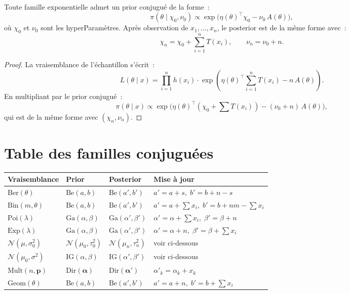 \begin{theoreme}
Toute famille exponentielle admet un prior conjugu\'e de la forme~:
\[
  \pi(\theta \mid \chi_0, \nu_0) \propto
  \exp\!\big(\eta(\theta)^\top \chi_0 - \nu_0\,A(\theta)\big),
\]
o\`u $\chi_0$ et $\nu_0$ sont les hyperParam\`etres. Apr\`es observation
de $x_1, \ldots, x_n$, le posterior est de la m\^eme forme avec~:
\[
  \chi_n = \chi_0 + \sum_{i=1}^n T(x_i), \qquad
  \nu_n = \nu_0 + n.
\]
\end{theoreme}

\begin{proof}
La vraisemblance de l'\'echantillon s'\'ecrit~:
\[
  L(\theta \mid x) = \prod_{i=1}^n h(x_i) \cdot
  \exp\!\left(\eta(\theta)^\top \sum_{i=1}^n T(x_i) - n\,A(\theta)\right).
\]
En multipliant par le prior conjugu\'e~:
\[
  \pi(\theta \mid x) \propto
  \exp\!\big(\eta(\theta)^\top (\chi_0 + \textstyle\sum T(x_i))
  - (\nu_0 + n)\,A(\theta)\big),
\]
qui est de la m\^eme forme avec $(\chi_n, \nu_n)$.
\end{proof}

\section{Table des familles conjugu\'ees}

\begin{formules}[title=\textbf{Principales familles conjugu\'ees}]
\begin{center}
\renewcommand{\arraystretch}{1.4}
\begin{tabular}{llll}
\toprule
\textbf{Vraisemblance} & \textbf{Prior} & \textbf{Posterior} & \textbf{Mise \`a jour} \\
\midrule
$\text{Ber}(\theta)$ & $\text{Be}(a,b)$ & $\text{Be}(a',b')$ &
  $a'=a+s,\; b'=b+n-s$ \\
$\text{Bin}(m,\theta)$ & $\text{Be}(a,b)$ & $\text{Be}(a',b')$ &
  $a'=a+\sum x_i,\; b'=b+nm-\sum x_i$ \\
$\text{Poi}(\lambda)$ & $\text{Ga}(\alpha,\beta)$ & $\text{Ga}(\alpha',\beta')$ &
  $\alpha'=\alpha+\sum x_i,\; \beta'=\beta+n$ \\
$\text{Exp}(\lambda)$ & $\text{Ga}(\alpha,\beta)$ & $\text{Ga}(\alpha',\beta')$ &
  $\alpha'=\alpha+n,\; \beta'=\beta+\sum x_i$ \\
$\mathcal{N}(\mu,\sigma^2_0)$ & $\mathcal{N}(\mu_0,\tau^2_0)$ &
  $\mathcal{N}(\mu_n,\tau^2_n)$ & voir ci-dessous \\
$\mathcal{N}(\mu_0,\sigma^2)$ & $\text{IG}(\alpha,\beta)$ &
  $\text{IG}(\alpha',\beta')$ & voir ci-dessous \\
$\text{Mult}(n,\boldsymbol{p})$ & $\text{Dir}(\boldsymbol{\alpha})$ &
  $\text{Dir}(\boldsymbol{\alpha}')$ &
  $\alpha'_k = \alpha_k + x_k$ \\
$\text{Geom}(\theta)$ & $\text{Be}(a,b)$ & $\text{Be}(a',b')$ &
  $a'=a+n,\; b'=b+\sum x_i$ \\
\bottomrule
\end{tabular}
\end{center}
\end{formules}

